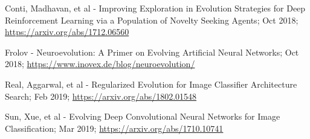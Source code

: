 \documentclass[journal, a4paper]{IEEEtran}
\begin{document}
\begin{thebibliography}{5}
    Conti, Madhavan, et al - Improving Exploration in Evolution Strategies for Deep Reinforcement Learning via a Population of Novelty Seeking Agents; Oct 2018;
    \url{https://arxiv.org/abs/1712.06560}

    Frolov - Neuroevolution: A Primer on Evolving Artificial Neural Networks; Oct 2018;
    \url{https://www.inovex.de/blog/neuroevolution/}

    Real, Aggarwal, et al - Regularized Evolution for Image Classifier Architecture Search; Feb 2019;
    \url{https://arxiv.org/abs/1802.01548}

    Sun, Xue, et al - Evolving Deep Convolutional Neural Networks for Image Classification; Mar 2019;
    \url{https://arxiv.org/abs/1710.10741}



\end{thebibliography}
\end{document}
